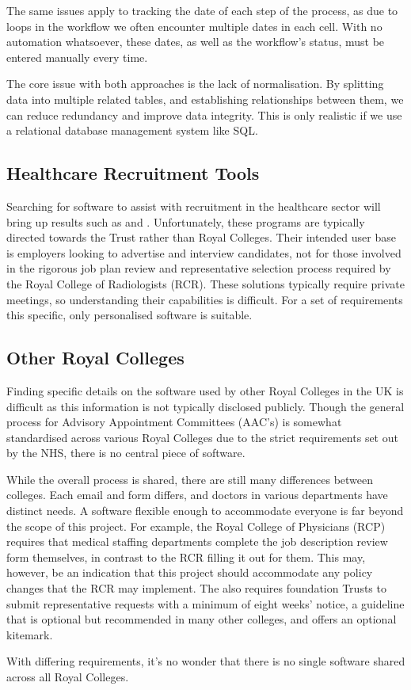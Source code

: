 The same issues apply to tracking the date of each step of the process, as due to loops in the workflow we often encounter multiple dates in each cell. With no automation whatsoever, these dates, as well as the workflow’s status, must be entered manually every time.

The core issue with both approaches is the lack of normalisation. By splitting data into multiple related tables, and establishing relationships between them, we can reduce redundancy and improve data integrity. This is only realistic if we use a relational database management system like SQL.

\subsection{Healthcare Recruitment Tools}
Searching for software to assist with recruitment in the healthcare sector will bring up results such as \textcite{icims_icims_nodate} and \textcite{the_access_group_access_nodate}. Unfortunately, these programs are typically directed towards the Trust rather than Royal Colleges. Their intended user base is employers looking to advertise and interview candidates, not for those involved in the rigorous job plan review and representative selection process required by the Royal College of Radiologists (RCR). These solutions typically require private meetings, so understanding their capabilities is difficult. For a set of requirements this specific, only personalised software is suitable.

\subsection{Other Royal Colleges}
Finding specific details on the software used by other Royal Colleges in the UK is difficult as this information is not typically disclosed publicly. Though the general process for Advisory Appointment Committees (AAC’s) is somewhat standardised across various Royal Colleges due to the strict requirements set out by the NHS, there is no central piece of software.

While the overall process is shared, there are still many differences between colleges. Each email and form differs, and doctors in various departments have distinct needs. A software flexible enough to accommodate everyone is far beyond the scope of this project. For example, the Royal College of Physicians (RCP) requires that medical staffing departments complete the job description review form themselves, in contrast to the RCR filling it out for them. This may, however, be an indication that this project should accommodate any policy changes that the RCR may implement. The \textcite{royal_college_of_physicians_of_london_rcp_2017} also requires foundation Trusts to submit representative requests with a minimum of eight weeks’ notice, a guideline that is optional but recommended in many other colleges, and offers an optional kitemark. 

With differing requirements, it’s no wonder that there is no single software shared across all Royal Colleges.
